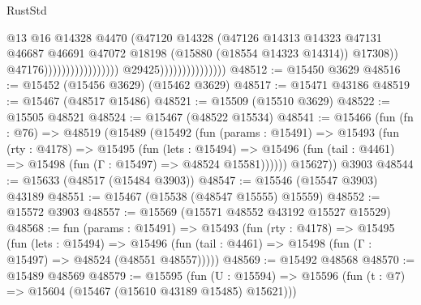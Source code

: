 \begin{lexlean}{RustStd}
\begin{coremodule}
                                                                    @13
                                                                    @16
                                                                    @14328
                                                                    @4470
                                                                    (@47120
                                                                      @14328
                                                                      (@47126
                                                                        @14313
                                                                        @14323
                                                                        @47131
                                                                        @46687
                                                                        @46691
                                                                        @47072
                                                                        @18198
                                                                        (@15880
                                                                          (@18554 @14323 @14314))
                                                                        @17308))
                                                                    @47176)))))))))))))))))
                                  @29425)))))))))))))))
@48512 := @15450 @3629
@48516 := @15452 (@15456 @3629) (@15462 @3629)
@48517 := @15471 @43186
@48519 := @15467 (@48517 @15486)
@48521 := @15509 (@15510 @3629)
@48522 := @15505 @48521
@48524 := @15467 (@48522 @15534)
@48541 := @15466
    (fun (fn : @76) =>
    @48519
      (@15489
        (@15492
          (fun (params : @15491) =>
          @15493
            (fun (rty : @4178) =>
            @15495
              (fun (lets : @15494) =>
              @15496 (fun (tail : @4461) => @15498 (fun (Γ : @15497) => @48524 @15581))))))
        @15627))
    @3903
@48544 := @15633 (@48517 (@15484 @3903))
@48547 := @15546 (@15547 @3903) @43189
@48551 := @15467 (@15538 (@48547 @15555) @15559)
@48552 := @15572 @3903
@48557 := @15569 (@15571 @48552 @43192 @15527 @15529)
@48568 := fun (params : @15491) =>
  @15493
    (fun (rty : @4178) =>
    @15495
      (fun (lets : @15494) =>
      @15496 (fun (tail : @4461) => @15498 (fun (Γ : @15497) => @48524 (@48551 @48557)))))
@48569 := @15492 @48568
@48570 := @15489 @48569
@48579 := @15595
    (fun (U : @15594) => @15596 (fun (t : @7) => @15604 (@15467 (@15610 @43189 @15485) @15621)))

\end{coremodule}
\end{lexlean}
